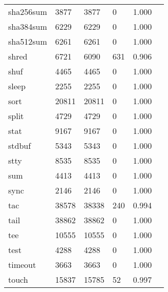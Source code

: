\begin{longtable}{lp{2.20cm}p{2.20cm}p{2.20cm}p{2.20cm}p{2.20cm}}
sha256sum &                     3877 &         3877 &             0 &                    1.000 \\
sha384sum &                     6229 &         6229 &             0 &                    1.000 \\
sha512sum &                     6261 &         6261 &             0 &                    1.000 \\
shred     &                     6721 &         6090 &           631 &                    0.906 \\
shuf      &                     4465 &         4465 &             0 &                    1.000 \\
sleep     &                     2255 &         2255 &             0 &                    1.000 \\
sort      &                    20811 &        20811 &             0 &                    1.000 \\
split     &                     4729 &         4729 &             0 &                    1.000 \\
stat      &                     9167 &         9167 &             0 &                    1.000 \\
stdbuf    &                     5343 &         5343 &             0 &                    1.000 \\
stty      &                     8535 &         8535 &             0 &                    1.000 \\
sum       &                     4413 &         4413 &             0 &                    1.000 \\
sync      &                     2146 &         2146 &             0 &                    1.000 \\
tac       &                    38578 &        38338 &           240 &                    0.994 \\
tail      &                    38862 &        38862 &             0 &                    1.000 \\
tee       &                    10555 &        10555 &             0 &                    1.000 \\
test      &                     4288 &         4288 &             0 &                    1.000 \\
timeout   &                     3663 &         3663 &             0 &                    1.000 \\
touch     &                    15837 &        15785 &            52 &                    0.997 \\

\end{longtable}
